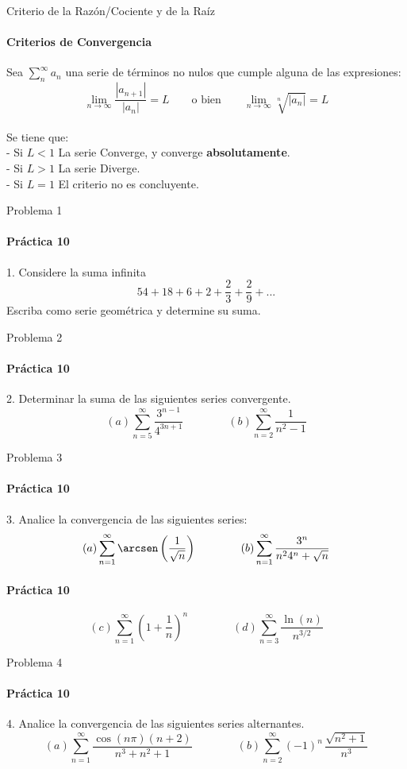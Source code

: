 \documentclass{plantillaPPT}
\begin{document}
\begin{frame}{Criterio de la Razón/Cociente y de la Raíz}
\framesubtitle{Criterios de Convergencia}

Sea \(\displaystyle\sum_{n}^\infty a_n\) una serie de términos no nulos que cumple alguna de las expresiones:\\[2ex]

\[\lim_{n\to\infty}\frac{|a_{n+1}|}{|a_n|} = L \qquad \text{o bien} \qquad \lim_{n\to\infty}\sqrt[n]{|a_n|} = L\]\\[2ex]
Se tiene que:\\[2ex]
- Si \(L<1\) La serie Converge, y converge \textbf{absolutamente}. \\[2ex]
- Si \(L>1\) La serie Diverge.\\[2ex]
- Si \(L=1\) El criterio no es concluyente.
    
\end{frame}

\begin{frame}{Problema 1}
\framesubtitle{Práctica 10}
1. Considere la suma infinita
\begin{equation*}
    54+18+6+2+\frac{2}{3}+\frac{2}{9}+...
\end{equation*}
Escriba como serie geométrica y determine su suma.
\end{frame}

\begin{frame}{Problema 2}
\framesubtitle{Práctica 10}

2. Determinar la suma de las siguientes series convergente.
\begin{equation*}
    (a) \sum_{n=5}^\infty \frac{3^{n-1}}{4^{3n+1}} \qquad \qquad (b) \sum_{n=2}^\infty \frac{1}{n^2-1}
\end{equation*}
\end{frame}

\begin{frame}{Problema 3}
\framesubtitle{Práctica 10}
3. Analice la convergencia de las siguientes series:
\begin{equation*}
(a) \sum_{n=1}^\infty \arcsen\left(\frac{1}{\sqrt{n}}\right) \qquad \qquad (b) \sum_{n=1}^\infty \frac{3^n}{n^24^n+\sqrt{n}}
\end{equation*}
\end{frame}

\begin{frame}
\framesubtitle{Práctica 10}
\begin{equation*}
    (c) \sum_{n=1}^\infty \left(1+\frac{1}{n}\right)^n \qquad \qquad (d)
\sum_{n=3}^\infty \frac{\ln(n)}{n^{3/2}}
\end{equation*}
\end{frame}

\begin{frame}{Problema 4}
\framesubtitle{Práctica 10}
4. Analice la convergencia de las siguientes series alternantes.
\begin{equation*}
(a)\sum_{n=1}^\infty \frac{\cos(n\pi)(n+2)}{n^3+n^2+1} \qquad \qquad (b) \sum_{n=2}^\infty (-1)^n\,\frac{\sqrt{n^2+1}}{n^3}
\end{equation*}
    
\end{frame}
\end{document}
